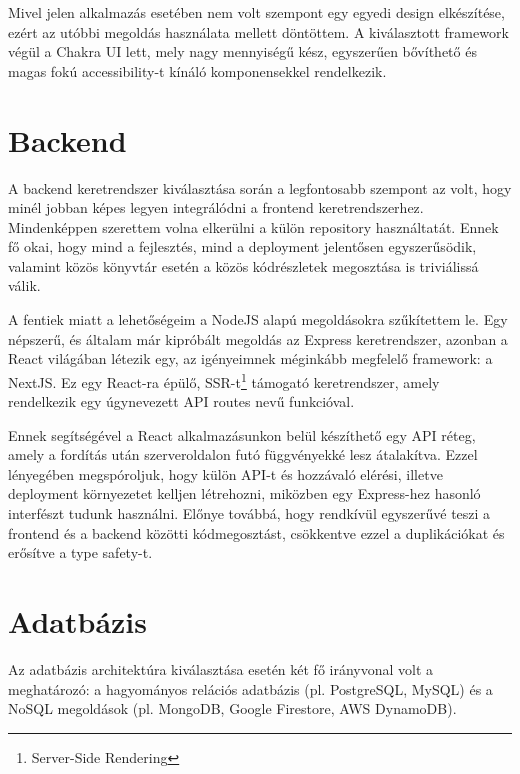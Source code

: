 Mivel jelen alkalmazás esetében nem volt szempont egy egyedi design elkészítése, ezért az utóbbi megoldás használata mellett döntöttem.
A kiválasztott framework végül a Chakra UI lett, mely nagy mennyiségű kész, egyszerűen bővíthető és magas fokú accessibility-t kínáló komponensekkel rendelkezik.

\section{Backend}
A backend keretrendszer kiválasztása során a legfontosabb szempont az volt, hogy minél jobban képes legyen integrálódni a frontend keretrendszerhez.
Mindenképpen szerettem volna elkerülni a külön repository használtatát.
Ennek fő okai, hogy mind a fejlesztés, mind a deployment jelentősen egyszerűsödik, valamint közös könyvtár esetén a közös kódrészletek megosztása is triviálissá válik.

A fentiek miatt a lehetőségeim a NodeJS alapú megoldásokra szűkítettem le. Egy népszerű, és általam már kipróbált megoldás az Express keretrendszer, azonban a React világában létezik egy, az igényeimnek méginkább megfelelő framework: a NextJS.
Ez egy React-ra épülő, SSR-t\footnote{Server-Side Rendering} támogató keretrendszer, amely rendelkezik egy úgynevezett API routes nevű funkcióval.

Ennek segítségével a React alkalmazásunkon belül készíthető egy API réteg, amely a fordítás után szerveroldalon futó függvényekké lesz átalakítva.
Ezzel lényegében megspóroljuk, hogy külön API-t és hozzávaló elérési, illetve deployment környezetet kelljen létrehozni, miközben egy Express-hez hasonló interfészt tudunk használni.
Előnye továbbá, hogy rendkívül egyszerűvé teszi a frontend és a backend közötti kódmegosztást, csökkentve ezzel a duplikációkat és erősítve a type safety-t.

\section{Adatbázis}
Az adatbázis architektúra kiválasztása esetén két fő irányvonal volt a meghatározó: a hagyományos relációs adatbázis (pl. PostgreSQL, MySQL) és a NoSQL megoldások (pl. MongoDB, Google Firestore, AWS DynamoDB).

